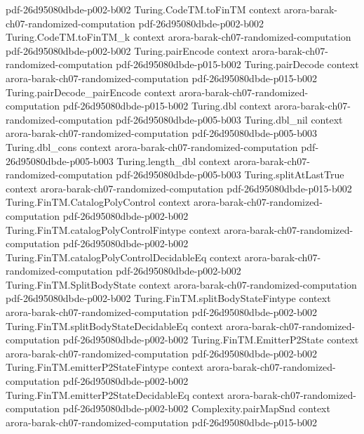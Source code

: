 \begin{theorem}
  {pdf-26d95080dbde-p002-b002}
\proofstep
  {Turing.CodeTM.toFinTM}
  {context}
  {arora-barak-ch07-randomized-computation}
  {pdf-26d95080dbde-p002-b002}
\proofstep
  {Turing.CodeTM.toFinTM_k}
  {context}
  {arora-barak-ch07-randomized-computation}
  {pdf-26d95080dbde-p002-b002}
\proofstep
  {Turing.pairEncode}
  {context}
  {arora-barak-ch07-randomized-computation}
  {pdf-26d95080dbde-p015-b002}
\proofstep
  {Turing.pairDecode}
  {context}
  {arora-barak-ch07-randomized-computation}
  {pdf-26d95080dbde-p015-b002}
\proofstep
  {Turing.pairDecode_pairEncode}
  {context}
  {arora-barak-ch07-randomized-computation}
  {pdf-26d95080dbde-p015-b002}
\proofstep
  {Turing.dbl}
  {context}
  {arora-barak-ch07-randomized-computation}
  {pdf-26d95080dbde-p005-b003}
\proofstep
  {Turing.dbl_nil}
  {context}
  {arora-barak-ch07-randomized-computation}
  {pdf-26d95080dbde-p005-b003}
\proofstep
  {Turing.dbl_cons}
  {context}
  {arora-barak-ch07-randomized-computation}
  {pdf-26d95080dbde-p005-b003}
\proofstep
  {Turing.length_dbl}
  {context}
  {arora-barak-ch07-randomized-computation}
  {pdf-26d95080dbde-p005-b003}
\proofstep
  {Turing.splitAtLastTrue}
  {context}
  {arora-barak-ch07-randomized-computation}
  {pdf-26d95080dbde-p015-b002}
\proofstep
  {Turing.FinTM.CatalogPolyControl}
  {context}
  {arora-barak-ch07-randomized-computation}
  {pdf-26d95080dbde-p002-b002}
\proofstep
  {Turing.FinTM.catalogPolyControlFintype}
  {context}
  {arora-barak-ch07-randomized-computation}
  {pdf-26d95080dbde-p002-b002}
\proofstep
  {Turing.FinTM.catalogPolyControlDecidableEq}
  {context}
  {arora-barak-ch07-randomized-computation}
  {pdf-26d95080dbde-p002-b002}
\proofstep
  {Turing.FinTM.SplitBodyState}
  {context}
  {arora-barak-ch07-randomized-computation}
  {pdf-26d95080dbde-p002-b002}
\proofstep
  {Turing.FinTM.splitBodyStateFintype}
  {context}
  {arora-barak-ch07-randomized-computation}
  {pdf-26d95080dbde-p002-b002}
\proofstep
  {Turing.FinTM.splitBodyStateDecidableEq}
  {context}
  {arora-barak-ch07-randomized-computation}
  {pdf-26d95080dbde-p002-b002}
\proofstep
  {Turing.FinTM.EmitterP2State}
  {context}
  {arora-barak-ch07-randomized-computation}
  {pdf-26d95080dbde-p002-b002}
\proofstep
  {Turing.FinTM.emitterP2StateFintype}
  {context}
  {arora-barak-ch07-randomized-computation}
  {pdf-26d95080dbde-p002-b002}
\proofstep
  {Turing.FinTM.emitterP2StateDecidableEq}
  {context}
  {arora-barak-ch07-randomized-computation}
  {pdf-26d95080dbde-p002-b002}
\proofstep
  {Complexity.pairMapSnd}
  {context}
  {arora-barak-ch07-randomized-computation}
  {pdf-26d95080dbde-p015-b002}

\end{theorem}
